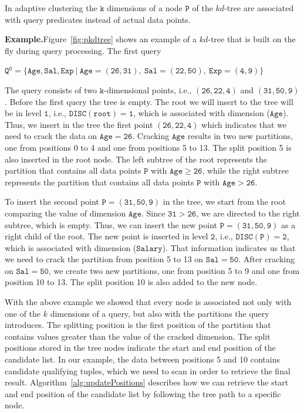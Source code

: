 In adaptive clustering the $\mathtt{k}$ dimensions of a node $\mathtt{P}$ of
the $kd$-tree are associated with query predicates instead of actual data points.

\textbf{Example.}Figure~\ref{fig:pkdtree} shows an example of a $kd$-tree that is built
on the fly during query processing.
The first query 
\begin{center}
$\mathtt{Q^0 = \{Age,Sal,Exp\ |\ Age = (26,31),\ Sal = (22,50),\ Exp = (4,9)\}}$ 
\end{center}
The query consists of two  $\mathtt{k}$-dimensional points, i.e., $\mathtt{(26,22,4)}$ and $\mathtt{(31,50,9)}$.
Before the first query the tree is empty.
The root we will insert to the tree will be in level $\mathtt{1}$, i.e.,  $\mathtt{DISC(root)=1}$, which is associated with dimension ($\mathtt{Age}$).
Thus, we insert in the tree the first point $\mathtt{(26,22,4)}$ which indicates that we need to crack the data on $\mathtt{Age=26}$.
Cracking $\mathtt{Age}$ results in two new partitions, one from positions 0 to 4 and one from positions 5 to 13.
The split position 5 is also inserted in the root node.
The left subtree of the root represents the partition that contains all data points $\mathtt{P}$ with $\mathtt{Age \geq 26}$, while the right subtree represents the partition that contains all data points $\mathtt{P}$ with $\mathtt{Age > 26}$.

To insert the second point $\mathtt{P=(31,50,9)}$ in the tree, we start from the root comparing the value of dimension $\mathtt{Age}$.
Since $\mathtt{31 > 26}$, we are directed to the right subtree, which is empty.
Thus, we can insert the new point $\mathtt{P=(31,50,9)}$ as a right child of the root.
The new point is inserted in level $\mathtt{2}$, i.e.,  $\mathtt{DISC(P)=2}$, which is associated with dimension ($\mathtt{Salary}$).
That information indicates us that we need to crack the partition from position 5 to 13 on $\mathtt{Sal=50}$.
After cracking on  $\mathtt{Sal=50}$, we create two new partitions, one from position 5 to 9 and one from position 10 to 13.
The split position 10 is also added to the new node.

With the above example we showed that every node is associated not only with one of the $k$ dimensions of a query, 
but also with the partitions the query introduces.
The splitting position is the first position of the partition that contains values greater than the value of the cracked dimension.
The split positions stored in the tree nodes indicate the start and end position of the candidate list.
In our example, the data between positions 5 and 10 contains candidate qualifying tuples, which we need to scan in order to retrieve the final result.
Algorithm~\ref{alg:updatePositions} describes how we can retrieve the start and end position of the candidate list by following the tree path to a specific node.

